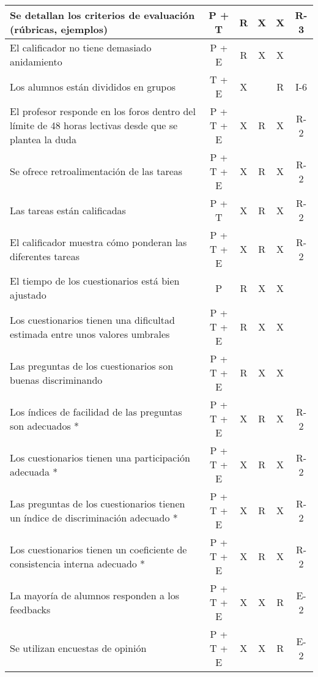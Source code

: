\begin{center}
\begin{longtable}{p{3cm} c c c c c}
        \hline
        Se detallan los criterios de evaluación (rúbricas, ejemplos) & P + T & R & X & X & R-3 \\
        \hline
        El calificador no tiene demasiado anidamiento & P + E & R & X & X & \\
        \hline
        Los alumnos están divididos en grupos & T + E & X & & R & I-6 \\
        \hline
        El profesor responde en los foros dentro del límite de 48 horas lectivas desde que se plantea la duda & P + T + E & X & R & X & R-2 \\
        \hline
        Se ofrece retroalimentación de las tareas & P + T + E & X & R & X & R-2 \\
        \hline
        Las tareas están calificadas & P + T & X & R & X & R-2 \\
        \hline
        El calificador muestra cómo ponderan las diferentes tareas & P + T + E & X & R & X & R-2 \\
        \hline
        El tiempo de los cuestionarios está bien ajustado & P & R & X & X & \\
        \hline
        Los cuestionarios tienen una dificultad estimada entre unos valores umbrales & P + T + E & R & X & X & \\
        \hline
        Las preguntas de los cuestionarios son buenas discriminando & P + T + E & R & X & X & \\
        \hline
        Los índices de facilidad de las preguntas son adecuados * & P + T + E & X & R & X & R-2 \\
        \hline
        Los cuestionarios tienen una participación adecuada * & P + T + E & X & R & X & R-2 \\
        \hline     
        Las preguntas de los cuestionarios tienen un índice de discriminación adecuado * & P + T + E & X & R & X & R-2\\
        \hline     
        Los cuestionarios tienen un coeficiente de consistencia interna adecuado * & P + T + E & X & R & X & R-2\\
        \hline             
        La mayoría de alumnos responden a los feedbacks & P + T + E & X & X & R & E-2 \\
        \hline
        Se utilizan encuestas de opinión & P + T + E & X & X & R & E-2 \\
        \hline
    \end{longtable}
\end{center}
